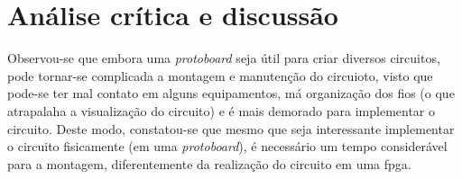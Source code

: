 \chapter{Análise crítica e discussão}
	Observou-se que embora uma \textit{protoboard} seja útil para criar diversos circuitos,
	pode tornar-se complicada a montagem e manutenção do circuioto, visto que pode-se ter
	mal contato em alguns equipamentos, má organização dos fios (o que atrapalaha a visualização
	do circuito) e é mais demorado para implementar o circuito.
	Deste modo, constatou-se que mesmo que seja interessante implementar o circuito fisicamente
	 (em uma \textit{protoboard}), é necessário um tempo considerável para a montagem, diferentemente
	da realização do circuito em uma \ac{fpga}.

